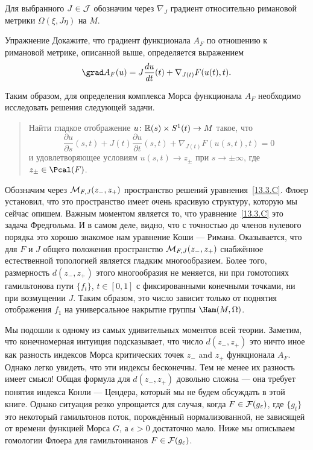 Для выбранного $J\in\mathcal{J}$ обозначим через $\nabla_{J}$ градиент
относительно римановой метрики $\Omega(\xi,J\eta)$ на $M$.
\begin{ex}{Упражнение}\label{13.3.B}
  Докажите, что градиент функционала $A_{F}$ по отношению к римановой метрике,
  описанной выше, определяется выражением 
  \[
  \grad A_{F}(u)=J\frac{\d u}{\d t}(t)+\nabla_{J(t)}F(u(t),t).
  \]
\end{ex}
Таким образом, для определения комплекса Морса функционала $A_{F}$
необходимо исследовать решения следующей задачи.
\begin{quote}
  Найти гладкое отображение $u \colon \mathbb{R}(s)\times S^{1}(t)\to M$ такое,
  что
  \begin{equation}\label{13.3.C}
    \frac{\partial u}{\partial s}(s,t) +
    J(t)\frac{\partial u}{\partial t}(s,t) +
    \nabla_{J(t)}F(u(s,t),t) = 0
  \end{equation}
  и удовлетворяющее условиям $u(s,t)\to z_{\pm}$ при $s\to\pm\infty$,
  где $z_{\pm}\z\in\Pcal(F)$.
\end{quote}
Обозначим через $\mathcal{M}_{F,J}(z_{-},z_{+})$ пространство решений
уравнения~\ref{13.3.C}. 
Флоер установил, что это пространство имеет очень красивую структуру,
которую мы сейчас опишем.
Важным моментом является то, что уравнение~\ref{13.3.C} это задача Фредгольма.
И в самом деле, видно, что с точностью до членов нулевого порядка это
хорошо знакомое нам уравнение Коши — Римана. 
Оказывается, что для $F$ и $J$ общего положения пространство
$\mathcal{M}_{F,J}(z_{-},z_{+})$ снабжённое естественной топологией является
гладким многообразием.  
Более того, размерность $d(z_{-}, z_{+})$ этого многообразия не меняется, ни при гомотопиях гамильтонова пути $\{f_{t}\}$, $t\in [0,1]$ с фиксированными конечными точками, ни при возмущении $J$.
Таким образом, это число зависит только от поднятия отображения $f_{1}$ на универсальное накрытие группы $\Ham(M,\Omega)$. 

Мы подошли к одному из самых удивительных моментов всей теории.
Заметим, что конечномерная интуиция подсказывает, что число $d(z_{-},
z_{+})$ это ничто иное как разность индексов Морса критических точек
$z_{-}$ and $z_{+}$ функционала $A_{F}$.
Однако легко увидеть, что эти индексы бесконечны.
Тем не менее их разность имеет смысл!
Общая формула для
$d(z_{-},z_{+})$ довольно сложна — она требует понятия индекса Конли — Цендера, который мы не будем обсуждать в этой книге.
Однако ситуация резко упрощается для случая, когда
$F\in\mathcal{F}(g_{\varepsilon})$, где $\{g_{t}\}$ это некоторый гамильтонов
поток, порождённый нормализованной, не зависящей от времени функцией
Морса $G$, а $\epsilon>0$ достаточно мало.
Ниже мы описываем гомологии Флоера для гамильтонианов
$F\in\mathcal{F}(g_{\varepsilon})$.

